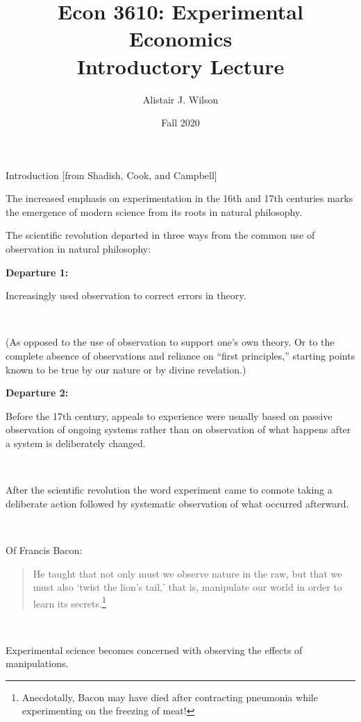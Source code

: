 \documentclass{beamer}
\begin{document}
\title{\LARGE Econ 3610: Experimental Economics \\ Introductory Lecture}
\author{Alistair J. Wilson }
\date{Fall 2020}

\maketitle

\begin{frame}{Introduction [from Shadish, Cook, and Campbell]}

The increased emphasis on experimentation in the 16th and 17th centuries
marks the emergence of modern science from its roots in natural philosophy.

The scientific revolution departed in three ways from the common use of
observation in natural philosophy:
\end{frame}

\begin{frame}
\textbf{Departure 1:}

Increasingly used observation to correct errors in theory.

\

\pause
(As opposed to the use of observation to support one's own theory. Or
to the complete absence of observations and reliance on ``first principles,''
starting points known to be true by our nature or by divine revelation.)
\end{frame}

\begin{frame}
\textbf{Departure 2:}

Before the 17th century, appeals to experience were usually based on
passive observation of ongoing systems rather than on observation of what
happens after a system is deliberately changed.

\

\pause
After the scientific revolution the word experiment came to connote taking a deliberate action
followed by systematic observation of what occurred afterward.
\pause

\

Of Francis Bacon:
\begin{quotation}
He taught that not only must we observe nature in the raw, but that we must also `twist the lion's tail,' that is, manipulate our world in order to learn its secrets.\footnote{Anecdotally, Bacon may have died after contracting pneumonia while experimenting on the freezing of meat!}
\end{quotation}
\pause

\

Experimental science becomes concerned with observing the effects of manipulations.
\end{frame}
\end{document}
